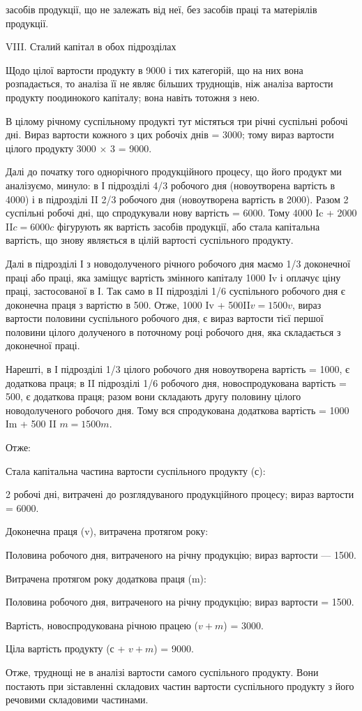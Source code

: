 \parcont{}  %
засобів продукції, що не залежать від неї, без засобів праці та матеріялів
продукції.

VIII. Сталий капітал в обох підрозділах

Щодо цілої вартости продукту в 9000 і тих категорій, що на них
вона розпадається, то аналіза її не являє більших труднощів, ніж аналіза
вартости продукту поодинокого капіталу; вона навіть тотожня з нею.

В цілому річному суспільному продукті тут містяться три річні суспільні
робочі дні. Вираз вартости кожного з цих робочіх днів = 3000; тому
вираз вартости цілого продукту 3000 × 3 = 9000.

Далі до початку того однорічного продукційного процесу, що його
продукт ми аналізуємо, минуло: в І підрозділі 4/3 робочого дня (новоутворена
вартість в 4000) і в підрозділі II 2/3 робочого дня (новоутворена
вартість в 2000). Разом 2 суспільні робочі дні, що спродукували
нову вартість = 6000. Тому 4000 Іc + 2000 II$c = 6000 c$ фігурують
як вартість засобів продукції, або стала капітальна вартість, що
знову являється в цілій вартості суспільного продукту.

Далі в підрозділі І з новодолученого річного робочого дня маємо 1/3
доконечної праці або праці, яка заміщує вартість змінного капіталу 1000
Іv і оплачує ціну праці, застосованої в І. Так само в II підрозділі 1/6 суспільного
робочого дня є доконечна праця з вартістю в 500. Отже, 1000
Iv + 500II$v = 1500v$, вираз вартости половини суспільного робочого
дня, є вираз вартости тієї першої половини цілого долученого в поточному
році робочого дня, яка складається з доконечної праці.

Нарешті, в І підрозділі 1/3 цілого робочого дня новоутворена вартість =
1000, є додаткова праця; в II підрозділі 1/6 робочого дня, новоспродукована
вартість = 500, є додаткова праця; разом вони складають другу
половину цілого новодолученого робочого дня. Тому вся спродукована
додаткова вартість = 1000 Іm + 500 II $m = 1500 m$.

Отже:

Стала капітальна частина вартости суспільного продукту (с):

2 робочі дні, витрачені до розглядуваного продукційного процесу;
вираз вартости = 6000.

Доконечна праця (v), витрачена протягом року:

Половина робочого дня, витраченого на річну продукцію; вираз вартости
— 1500.

Витрачена протягом року додаткова праця (m):

Половина робочого дня, витраченого на річну продукцію; вираз вартости
= 1500.

Вартість, новоспродукована річною працею ($v + m$) = 3000.

Ціла вартість продукту (с + $v + m$) = 9000.

Отже, труднощі не в аналізі вартости самого суспільного продукту.
Вони постають при зіставленні складових частин вартости суспільного
продукту з його речовими складовими частинами.
